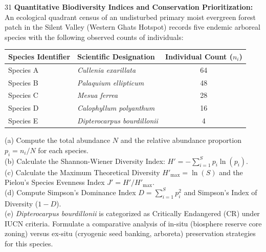 \begin{subjectiveq}{3}{1}
\textbf{Quantitative Biodiversity Indices and Conservation Prioritization:}\\An ecological quadrant census of an undisturbed primary moist evergreen forest patch in the Silent Valley (Western Ghats Hotspot) records five endemic arboreal species with the following observed counts of individuals:\begin{center}\begin{tabular}{llc}\toprule\textbf{Species Identifier} & \textbf{Scientific Designation} & \textbf{Individual Count ($n_i$)} \\\midrule Species A & \textit{Cullenia exarillata} & 64 \\Species B & \textit{Palaquium ellipticum} & 48 \\Species C & \textit{Mesua ferrea} & 28 \\Species D & \textit{Calophyllum polyanthum} & 16 \\Species E & \textit{Dipterocarpus bourdillonii} & 4 \\\bottomrule\end{tabular}\end{center}(a) Compute the total abundance $N$ and the relative abundance proportion $p_i = n_i / N$ for each species.\\(b) Calculate the Shannon-Wiener Diversity Index: $H' = -\sum_{i=1}^S p_i \ln(p_i)$.\\(c) Calculate the Maximum Theoretical Diversity $H'_{\text{max}} = \ln(S)$ and the Pielou's Species Evenness Index $J' = H' / H'_{\text{max}}$.\\(d) Compute Simpson's Dominance Index $D = \sum_{i=1}^S p_i^2$ and Simpson's Index of Diversity ($1 - D$).\\(e) \textit{Dipterocarpus bourdillonii} is categorized as Critically Endangered (CR) under IUCN criteria. Formulate a comparative analysis of in-situ (biosphere reserve core zoning) versus ex-situ (cryogenic seed banking, arboreta) preservation strategies for this species.
\end{subjectiveq}

